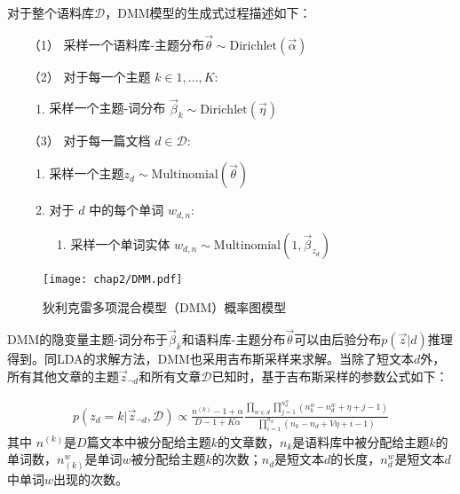 对于整个语料库$\mathcal{D}$，DMM模型的生成式过程描述如下：
\begin{enumerate}
    	
    	\item[（1）] 采样一个语料库-主题分布$\vec{\theta} \sim \mbox{Dirichlet}(\vec{\alpha})$
    	
    	\item[（2）] 对于每一个主题 $k\in {1,\dots,K}$:
    		\begin{enumerate}
    		\item 采样一个主题-词分布 $\vec\beta_k\sim \mbox{Dirichlet}(\vec\eta)$ 
    		\end{enumerate}
    		
    	\item[（3）] 对于每一篇文档 $d \in \mathcal{D}$:
    		\begin{enumerate}
    		\item 采样一个主题$z_{d} \sim \mbox{Multinomial}(\vec{\theta})$
    		\item 对于 $d$ 中的每个单词 $w_{d,n}$:
    			\begin{enumerate}
    			\item 采样一个单词实体 $w_{d,n}\sim \mbox{Multinomial}(1,\vec\beta_{z_{d}})$
    			\end{enumerate}	
    		\end{enumerate}	 
\end{enumerate}
 
\begin{figure}[ht]
	\centering
	\texttt{[image: chap2/DMM.pdf]}\\
	\caption{狄利克雷多项混合模型（DMM）概率图模型}\label{DMMProbGraph}
\end{figure}

DMM的隐变量主题-词分布于$\vec{\beta}_{k}$和语料库-主题分布$\vec{\theta}$可以由后验分布$p(\vec{z}|d)$推理得到。同LDA的求解方法，DMM也采用吉布斯采样来求解。当除了短文本$d$外，所有其他文章的主题$\vec{z}_{\lnot d}$和所有文章$\mathcal{D}$已知时，基于吉布斯采样的参数公式如下：

\begin{equation} 
	\begin{aligned}
	p(z_d = k |\vec{z}_{\lnot d},\mathcal{D})   \propto
	\frac{n^{(k)}-1+\alpha}{D-1+K\alpha}
	\frac{\prod_{w \in d} \prod_{j=1}^{n_{d}^w}(n_{k}^w-n_{d}^w+\eta+j-1)} {\prod_{i=1}^{n_{d}}(n_{k}-n_{d}+V\eta+i-1)}
	\end{aligned}
\label{pzdDMM}
\end{equation}
其中 $n^{(k)}$是$D$篇文本中被分配给主题$k$的文章数，$n_{k}$是语料库中被分配给主题$k$的单词数，$n_{(k)}^w$是单词$w$被分配给主题$k$的次数；$n_d$是短文本$d$的长度，$n_d^w$是短文本$d$中单词$w$出现的次数。

